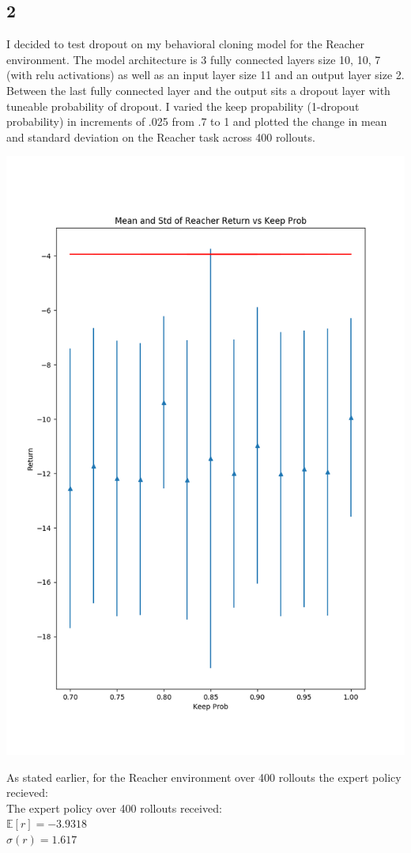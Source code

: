\documentclass[12pt]{report}
\begin{document}
\subsection*{2}
I decided to test dropout on my behavioral cloning model for the Reacher environment. The model architecture is 3 fully connected layers size 10, 10, 7 (with relu activations) as well as an input layer  size 11 and an output layer size 2. Between the last fully connected layer and the output sits a dropout layer with tuneable probability of dropout. I varied the keep propability (1-dropout probability) in increments of .025 from .7 to 1 and plotted the change in mean and standard deviation on the Reacher task across 400 rollouts.
\begin{center}
\includegraphics[scale=.5]{./images/2_2.png}
\end{center}
\vspace*{.5in}
As stated earlier, for the Reacher environment over 400 rollouts the expert policy recieved:\\
The expert policy over 400 rollouts received:\\
$\mathbb{E}[r]=-3.9318$\\
$\sigma(r) =  1.617$\\
\end{document}

